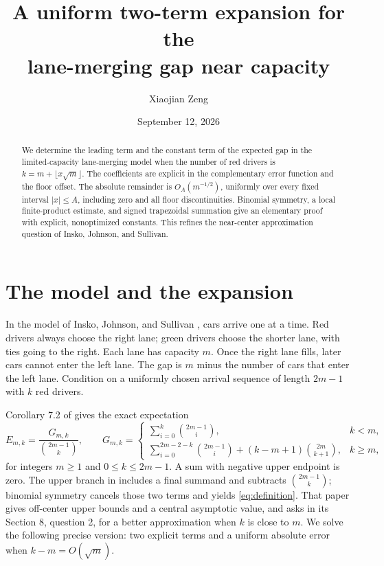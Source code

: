 \documentclass[11pt]{amsart}
\title[The lane-merging gap near capacity]{A uniform two-term expansion for the\\lane-merging gap near capacity}
\author{Xiaojian Zeng}
\date{September 12, 2026}
\begin{document}
\begin{abstract}
We determine the leading term and the constant term of the expected gap
in the limited-capacity lane-merging model when the number of red drivers
is $k=m+\lfloor x\sqrt m\rfloor$. The coefficients are explicit in the
complementary error function and the floor offset. The absolute remainder
is $O_A(m^{-1/2})$, uniformly over every fixed interval $|x|\le A$,
including zero and all floor discontinuities. Binomial symmetry, a local
finite-product estimate, and signed trapezoidal summation give an
elementary proof with explicit, nonoptimized constants. This refines the
near-center approximation question of Insko, Johnson, and Sullivan.
\end{abstract}
\maketitle

\section{The model and the expansion}

In the model of Insko, Johnson, and Sullivan \cite{IJS2026}, cars arrive
one at a time. Red drivers always choose the right lane; green drivers
choose the shorter lane, with ties going to the right. Each lane has
capacity $m$. Once the right lane fills, later cars cannot enter the
left lane. The gap is $m$ minus the number of cars that enter the left
lane. Condition on a uniformly chosen arrival sequence of length $2m-1$
with $k$ red drivers.

Corollary 7.2 of \cite{IJS2026} gives the exact expectation
\begin{equation}\label{eq:definition}
 E_{m,k}=\frac{G_{m,k}}{\binom{2m-1}{k}},\qquad
 G_{m,k}=
 \begin{cases}
 \displaystyle\sum_{i=0}^k\binom{2m-1}{i},&k<m,\\[5pt]
 \displaystyle\sum_{i=0}^{2m-2-k}\binom{2m-1}{i}
 +(k-m+1)\binom{2m}{k+1},&k\ge m,
 \end{cases}
\end{equation}
for integers $m\ge1$ and $0\le k\le2m-1$. A sum with negative upper
endpoint is zero. The upper branch in \cite{IJS2026} includes a final
summand and subtracts $\binom{2m-1}{k}$; binomial symmetry cancels those
two terms and yields \eqref{eq:definition}.
That paper gives off-center upper bounds and a central asymptotic
value, and asks in its Section 8, question 2, for a better approximation
when $k$ is close to $m$. We solve the following precise version:
two explicit terms and a uniform absolute error when $k-m=O(\sqrt m)$.
\end{document}

